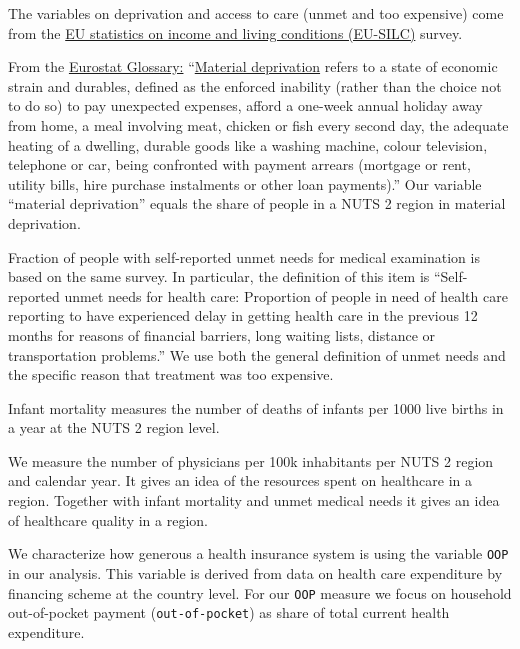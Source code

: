 \documentclass[a4paper,12pt]{article}
\begin{document}
The variables on deprivation and access to care (unmet and too expensive) come from the \href{https://ec.europa.eu/eurostat/statistics-explained/index.php?title=EU\_statistics\_on\_income\_and\_living\_conditions\_(EU-SILC)\_methodology}{EU statistics on income and living conditions (EU-SILC)} survey.

From the \href{https://ec.europa.eu/eurostat/statistics-explained/index.php?title=Glossary:At-risk-of-poverty\_rate}{Eurostat Glossary:} ``\href{https://ec.europa.eu/eurostat/statistics-explained/index.php?title=Glossary:Material\_deprivation}{Material deprivation} refers to a state of economic strain and durables, defined as the enforced inability (rather than the choice not to do so) to pay unexpected expenses, afford a one-week annual holiday away from home, a meal involving meat, chicken or fish every second day, the adequate heating of a dwelling, durable goods like a washing machine, colour television, telephone or car, being confronted with payment arrears (mortgage or rent, utility bills, hire purchase instalments or other loan payments).'' Our variable ``material deprivation'' equals the share of people in a NUTS 2 region in material deprivation.

Fraction of people with self-reported unmet needs for medical examination is based on the same survey. In particular, the definition of this item is ``Self-reported unmet needs for health care: Proportion of people in need of health care reporting to have experienced delay in getting health care in the previous 12 months for reasons of financial barriers, long waiting lists, distance or transportation problems.'' We use both the general definition of unmet needs and the specific reason that treatment was too expensive.

Infant mortality measures the number of deaths of infants per 1000 live births in a year at the NUTS 2 region level.

We measure the number of physicians per 100k inhabitants per NUTS 2 region and calendar year. It gives an idea of the resources spent on healthcare in a region. Together with infant mortality and unmet medical needs it gives an idea of healthcare quality in a region.

We characterize how generous a health insurance system is using the variable \texttt{OOP} in our analysis. This variable is derived from data on health care expenditure by financing scheme at the country level. For our \texttt{OOP} measure we focus on household out-of-pocket payment (\texttt{out-of-pocket}) as share of total current health expenditure.
\end{document}
